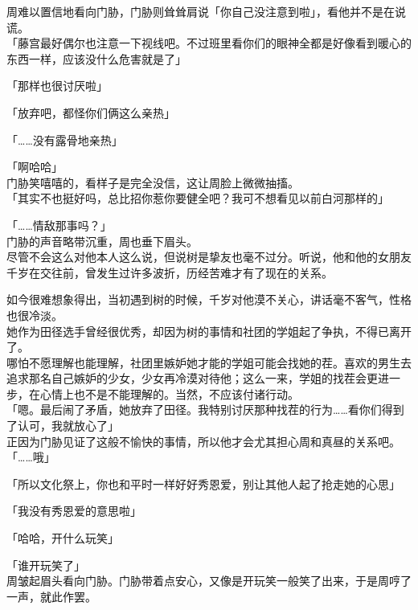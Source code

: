 周难以置信地看向门胁，门胁则耸耸肩说「你自己没注意到啦」，看他并不是在说谎。\\

「藤宫最好偶尔也注意一下视线吧。不过班里看你们的眼神全都是好像看到暖心的东西一样，应该没什么危害就是了」

「那样也很讨厌啦」

「放弃吧，都怪你们俩这么亲热」

「……没有露骨地亲热」

「啊哈哈」\\

门胁笑嘻嘻的，看样子是完全没信，这让周脸上微微抽搐。\\

「其实不也挺好吗，总比招你惹你要健全吧？我可不想看见以前白河那样的」

「……情敌那事吗？」\\

门胁的声音略带沉重，周也垂下眉头。\\

尽管不会这么对他本人这么说，但说树是挚友也毫不过分。听说，他和他的女朋友千岁在交往前，曾发生过许多波折，历经苦难才有了现在的关系。

如今很难想象得出，当初遇到树的时候，千岁对他漠不关心，讲话毫不客气，性格也很冷淡。\\

她作为田径选手曾经很优秀，却因为树的事情和社团的学姐起了争执，不得已离开了。\\

哪怕不愿理解也能理解，社团里嫉妒她才能的学姐可能会找她的茬。喜欢的男生去追求那名自己嫉妒的少女，少女再冷漠对待他；这么一来，学姐的找茬会更进一步，在心情上也不是不能理解的。当然，不应该付诸行动。\\

「嗯。最后闹了矛盾，她放弃了田径。我特别讨厌那种找茬的行为……看你们得到了认可，我就放心了」\\

正因为门胁见证了这般不愉快的事情，所以他才会尤其担心周和真昼的关系吧。\\

「……哦」

「所以文化祭上，你也和平时一样好好秀恩爱，别让其他人起了抢走她的心思」

「我没有秀恩爱的意思啦」

「哈哈，开什么玩笑」

「谁开玩笑了」\\

周皱起眉头看向门胁。门胁带着点安心，又像是开玩笑一般笑了出来，于是周哼了一声，就此作罢。
